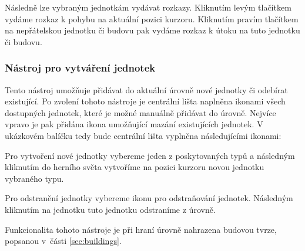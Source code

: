 Následně lze vybraným jednotkám vydávat rozkazy. Kliknutím levým tlačítkem vydáme rozkaz k pohybu na aktuální pozici kurzoru. Kliknutím pravím tlačítkem na nepřátelskou jednotku či budovu pak vydáme rozkaz k útoku na tuto jednotku či budovu.

\subsubsection{Nástroj pro vytváření jednotek}
Tento nástroj umožňuje přidávat do aktuální úrovně nové jednotky či odebírat existující. Po zvolení tohoto nástroje je centrální lišta naplněna ikonami všech dostupných jednotek, které je možné manuálně přidávat do úrovně. Nejvíce vpravo je pak přidána ikona umožňující mazání existujících jednotek. V ukázkovém balíčku tedy bude centrální lišta vyplněna následujícími ikonami:

\medskip
{}

\medskip
{}

\medskip
{}


\bigskip


Pro vytvoření nové jednotky vybereme jeden z poskytovaných typů a následným kliknutím do herního světa vytvoříme na pozici kurzoru novou jednotku vybraného typu.

Pro odstranění jednotky vybereme ikonu pro odstraňování jednotek. Následným kliknutím na jednotku tuto jednotku odstraníme z úrovně.

Funkcionalita tohoto nástroje je při hraní úrovně nahrazena budovou tvrze, popsanou v~části \ref{sec:buildings}.


